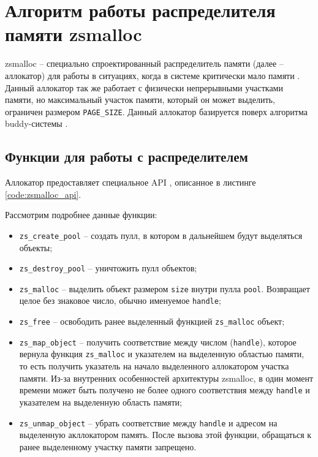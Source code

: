\section{Алгоритм работы распределителя памяти zsmalloc}

zsmalloc -- специально спроектированный распределитель памяти (далее -- аллокатор) для работы в ситуациях, когда в системе критически мало памяти \cite{zsmalloc}. Данный аллокатор так же работает с физически непрерывными участками памяти, но максимальный участок памяти, который он может выделить, ограничен размером \texttt{PAGE\_SIZE}. Данный аллокатор базируется поверх алгоритма buddy-системы \cite{kernel-development}. 

\subsection{Функции для работы с распределителем}

Аллокатор предоставляет специальное API  \cite{bootlin}, описанное в листинге \ref{code:zsmalloc_api}.


Рассмотрим подробнее данные функции:

\begin{itemize}
	\item \texttt{zs\_create\_pool} -- создать пулл, в котором в дальнейшем будут выделяться объекты;
	\item \texttt{zs\_destroy\_pool} -- уничтожить пулл объектов;
	\item \texttt{zs\_malloc} -- выделить объект размером \texttt{size} внутри пулла \texttt{pool}. Возвращает целое без знаковое число, обычно именуемое \texttt{handle};
	\item \texttt{zs\_free} -- освободить ранее выделенный функцией \texttt{zs\_malloc} объект;
	\item \texttt{zs\_map\_object} -- получить соответствие между числом (\texttt{handle}), которое вернула функция \texttt{zs\_malloc} и указателем на выделенную областью памяти, то есть получить указатель на начало выделенного аллокатором участка памяти. Из-за внутренних особенностей архитектуры zsmalloc, в один момент времени может быть получено не более одного соответствия между \texttt{handle} и указателем на выделенную область памяти;
	\item \texttt{zs\_unmap\_object} -- убрать соответствие между \texttt{handle} и адресом на выделенную акллокатором память. После вызова этой функции, обращаться к ранее выделенному участку памяти запрещено. 
\end{itemize}


